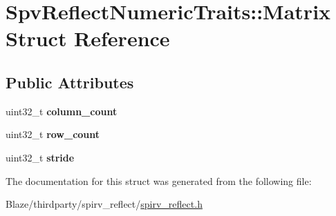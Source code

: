 \hypertarget{structSpvReflectNumericTraits_1_1Matrix}{}\section{Spv\+Reflect\+Numeric\+Traits\+:\+:Matrix Struct Reference}
\label{structSpvReflectNumericTraits_1_1Matrix}
\subsection*{Public Attributes}
\begin{DoxyCompactItemize}
\item 
\mbox{\label{structSpvReflectNumericTraits_1_1Matrix_a7bbc584131362c1f3dcc624c2489b029}} 
uint32\+\_\+t {\bfseries column\+\_\+count}
\item 
\mbox{\label{structSpvReflectNumericTraits_1_1Matrix_afc1546ed80969f38f306a0814a126869}} 
uint32\+\_\+t {\bfseries row\+\_\+count}
\item 
\mbox{\label{structSpvReflectNumericTraits_1_1Matrix_abf0e3dc3d1451fe194dc3f53237d40f4}} 
uint32\+\_\+t {\bfseries stride}
\end{DoxyCompactItemize}


The documentation for this struct was generated from the following file\+:\begin{DoxyCompactItemize}
\item 
Blaze/thirdparty/spirv\+\_\+reflect/\hyperlink{spirv__reflect_8h}{spirv\+\_\+reflect.\+h}\end{DoxyCompactItemize}
